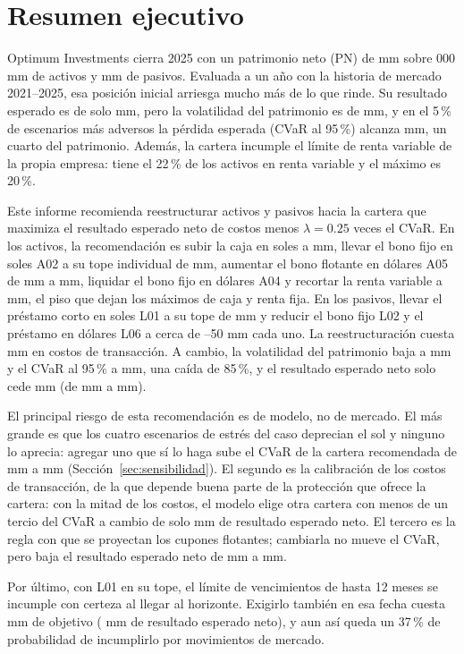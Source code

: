 \section{Resumen ejecutivo}\label{sec:resumen}

Optimum Investments cierra 2025 con un patrimonio neto (PN) de  mm sobre 000 mm de activos
y  mm de pasivos. Evaluada a un año con la historia de mercado 2021--2025, esa posición inicial
arriesga mucho más de lo que rinde. Su resultado esperado es de solo  mm, pero la volatilidad del
patrimonio es de  mm, y en el 5\,\% de escenarios más adversos la pérdida esperada (CVaR al 95\,\%)
alcanza  mm, un cuarto del patrimonio. Además, la cartera incumple el límite de renta variable de la
propia empresa: tiene el 22\,\% de los activos en renta variable y el máximo es 20\,\%.

Este informe recomienda reestructurar activos y pasivos hacia la cartera que maximiza el resultado esperado
neto de costos menos $\lambda = 0.25$ veces el CVaR. En los activos, la recomendación es subir la caja en
soles a  mm, llevar el bono fijo en soles A02 a su tope individual de  mm, aumentar el bono
flotante en dólares A05 de  mm a  mm, liquidar el bono fijo en dólares A04 y recortar la
renta variable a  mm, el piso que dejan los máximos de caja y renta fija. En los pasivos, llevar el préstamo corto en soles L01 a su tope de  mm y reducir el bono fijo L02 y
el préstamo en dólares L06 a cerca de --50 mm cada uno. La reestructuración cuesta  mm en
costos de transacción. A cambio, la volatilidad del patrimonio baja a  mm y el CVaR al 95\,\% a
 mm, una caída de 85\,\%, y el resultado esperado neto solo cede  mm (de  mm a
 mm).

El principal riesgo de esta recomendación es de modelo, no de mercado. El más grande es que los cuatro
escenarios de estrés del caso deprecian el sol y ninguno lo aprecia: agregar uno que sí lo haga sube el CVaR
de la cartera recomendada de  mm a  mm (Sección~\ref{sec:sensibilidad}). El segundo es la
calibración de los costos de transacción, de la que depende buena parte de la protección que ofrece la
cartera: con la mitad de los costos, el modelo elige otra cartera con menos de un tercio del CVaR a cambio
de solo  mm de resultado esperado neto. El tercero es la regla con que se proyectan los cupones flotantes; cambiarla no mueve
el CVaR, pero baja el resultado esperado neto de  mm a  mm.

Por último, con L01 en su tope, el límite de vencimientos de hasta 12 meses se incumple con certeza al
llegar al horizonte. Exigirlo también en esa fecha cuesta  mm de objetivo ( mm de
resultado esperado neto), y aun así queda un 37\,\% de probabilidad de incumplirlo por movimientos de
mercado.
